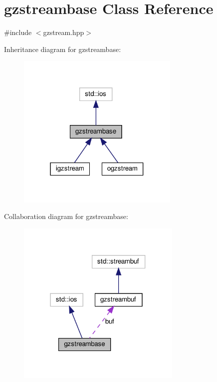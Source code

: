 \hypertarget{classgzstreambase}{}\section{gzstreambase Class Reference}
\label{classgzstreambase}


{\ttfamily \#include $<$gzstream.\+hpp$>$}



Inheritance diagram for gzstreambase\+:
\nopagebreak
\begin{figure}[H]
\begin{center}
\leavevmode
\includegraphics[width=220pt]{dc/d52/classgzstreambase__inherit__graph}
\end{center}
\end{figure}


Collaboration diagram for gzstreambase\+:
\nopagebreak
\begin{figure}[H]
\begin{center}
\leavevmode
\includegraphics[width=223pt]{d8/d5e/classgzstreambase__coll__graph}
\end{center}
\end{figure}

